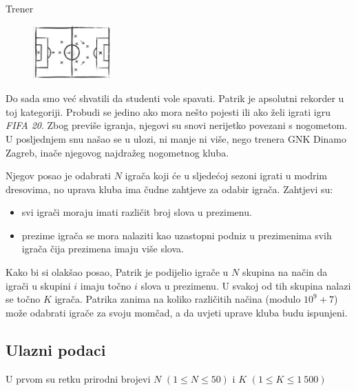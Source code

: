 \begin{statement}[
  problempoints=110,
  timelimit=1 sekunda,
  memorylimit=512 MiB,
]{Trener}

\setlength\intextsep{-0.1cm}
\begin{figure}
\centering
\includegraphics[width=0.27\textwidth]{img/trener.png}
\end{figure}

Do sada smo već shvatili da studenti vole spavati. Patrik je apsolutni rekorder
u toj kategoriji. Probudi se jedino ako mora nešto pojesti ili ako želi
igrati igru \textit{FIFA 20}. Zbog previše igranja, njegovi su snovi nerijetko
povezani s nogometom. U posljednjem snu našao se u ulozi, ni manje ni više,
nego trenera GNK Dinamo Zagreb, inače njegovog najdražeg nogometnog kluba.

Njegov posao je odabrati $N$ igrača koji će u sljedećoj sezoni igrati u modrim
dresovima, no uprava kluba ima čudne zahtjeve za odabir igrača. Zahtjevi su:

\begin{itemize}
  \item svi igrači moraju imati različit broj slova u prezimenu.
  \item prezime igrača se mora nalaziti kao uzastopni podniz u prezimenima svih
        igrača čija prezimena imaju više slova.
\end{itemize}

Kako bi si olakšao posao, Patrik je podijelio igrače u $N$ skupina na način da
igrači u skupini $i$ imaju točno $i$ slova u prezimenu. U svakoj od tih
skupina nalazi se točno $K$ igrača. Patrika zanima na koliko različitih
načina (modulo $10^9 + 7$) može odabrati igrače za svoju momčad, a da uvjeti
uprave kluba budu ispunjeni.

\subsection*{Ulazni podaci}
U prvom su retku prirodni brojevi $N$ $(1 \le N \le 50)$ i $K$ $(1 \le K \le 1\
500)$


\end{statement}
